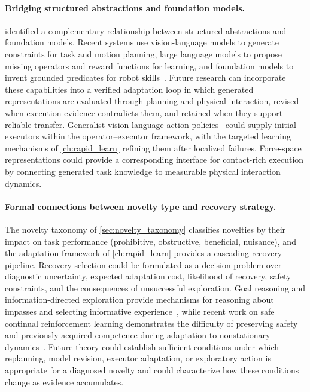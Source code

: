 \paragraph{Bridging structured abstractions and foundation models.}
 identified a complementary relationship between structured abstractions and foundation models. Recent systems use vision-language models to generate constraints for task and motion planning, large language models to propose missing operators and reward functions for learning, and foundation models to invent grounded predicates for robot skills~\citep{kumar2026openworldtamp,lu2026novelty,yang2025skillwrapper}. Future research can incorporate these capabilities into a verified adaptation loop in which generated representations are evaluated through planning and physical interaction, revised when execution evidence contradicts them, and retained when they support reliable transfer. Generalist vision-language-action policies~\citep{team2024octo,black2024pi_0} could supply initial executors within the operator--executor framework, with the targeted learning mechanisms of \cref{ch:rapid_learn} refining them after localized failures. Force-space representations could provide a corresponding interface for contact-rich execution by connecting generated task knowledge to measurable physical interaction dynamics.

\paragraph{Formal connections between novelty type and recovery strategy.}
The novelty taxonomy of \cref{sec:novelty_taxonomy} classifies novelties by their impact on task performance (prohibitive, obstructive, beneficial, nuisance), and the adaptation framework of \cref{ch:rapid_learn} provides a cascading recovery pipeline. Recovery selection could be formulated as a decision problem over diagnostic uncertainty, expected adaptation cost, likelihood of recovery, safety constraints, and the consequences of unsuccessful exploration. Goal reasoning and information-directed exploration provide mechanisms for reasoning about impasses and selecting informative experience~\citep{aha2018goalreasoning,lorang2022speeding}, while recent work on safe continual reinforcement learning demonstrates the difficulty of preserving safety and previously acquired competence during adaptation to nonstationary dynamics~\citep{coursey2026safe}. Future theory could establish sufficient conditions under which replanning, model revision, executor adaptation, or exploratory action is appropriate for a diagnosed novelty and could characterize how these conditions change as evidence accumulates.

